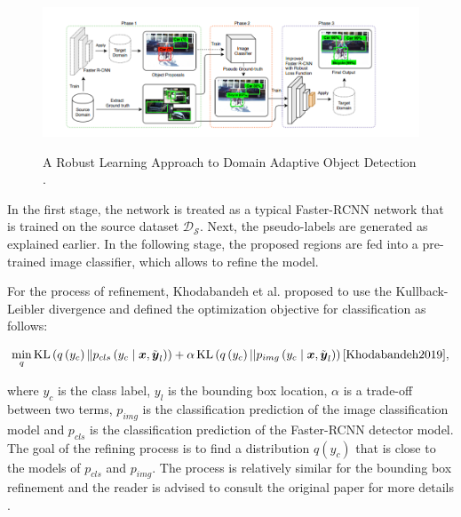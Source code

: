 \documentclass[english, 12pt, a4paper, elec, utf8, a-1b, online]{aaltothesis}
\begin{document}
\begin{figure}[htb]
	\begin{center}
		\includegraphics[width=16cm]{./robust.png}
	\end{center}
	\caption{A Robust Learning Approach to Domain Adaptive Object Detection \cite{Khodabandeh2019}.}
	\begin{center}
		\label{robust}
	\end{center}
\end{figure}
\FloatBarrier

In the first stage, the network is treated as a typical Faster-RCNN network that is trained on the source dataset $\mathcal{D_S}$. Next, the pseudo-labels are generated as explained earlier. In the following stage, the proposed regions are fed into a pre-trained image classifier, which allows to refine the model.

For the process of refinement, Khodabandeh et al. proposed to use the Kullback-Leibler divergence and defined the optimization objective for classification as follows: 

\begin{equation}
\min _{q} \operatorname{KL}\left(q\left(y_{c}\right) \| p_{c l s}\left(y_{c} \mid \boldsymbol{x}, \tilde{\boldsymbol{y}}_{l}\right)\right)+\alpha \operatorname{KL}\left(q\left(y_{c}\right)|| p_{i m g}\left(y_{c} \mid \boldsymbol{x}, \tilde{\boldsymbol{y}}_{l}\right)\right)
\label{KL_DV} 
\cite{Khodabandeh2019},
\end{equation}

where $y_c$ is the class label, $y_l$ is the bounding box location, $\alpha$ is a trade-off between two terms,  $p_{img}$ is the classification prediction of the image classification model and $p_{cls}$ is the classification prediction of the Faster-RCNN detector model. The goal of the refining process is to find a distribution $q(y_c)$ that is close to the models of $p_{cls}$ and $p_{img}$. The process is relatively similar for the bounding box refinement and the reader is advised to consult the original paper for more details \cite{Khodabandeh2019}.  
\end{document}
